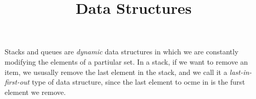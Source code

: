 \documentclass{article}
\title{Data Structures}
\begin{document}
\maketitle
Stacks and queues are \textit{dynamic} data structures in which we are constantly modifying the 
elements of a partiular set. In a stack, if we want to remove an item, we ususally remove the 
last element in the stack, and we call it a \textit{last-in-first-out} type of  data structure, 
since the last element to ocme in is the furst element we remove.
\end{document}
